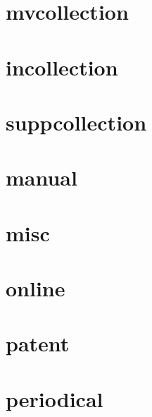 \documentclass{article}
\begin{document}
\cite[1]{collection}

\section{mvcollection}

\cite[1]{mvcollection}

\cite[1]{mvcollection}

\section{incollection}

\cite[1]{incollection}

\cite[1]{incollection}

\section{suppcollection}

\cite[1]{suppcollection}

\cite[1]{suppcollection}

\section{manual}

\cite[1]{manual}

\cite[1]{manual}

\section{misc}

\cite[1]{misc}

\cite[1]{misc}

\section{online}

\cite[1]{online}

\cite[1]{online}

\section{patent}

\cite[1]{patent}

\cite[1]{patent}

\section{periodical}
\end{document}
